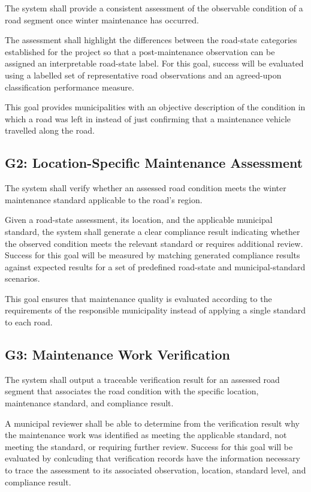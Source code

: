 \documentclass{article}
\begin{document}
The system shall provide a consistent assessment of the observable condition of
a road segment once winter maintenance has occurred.

The assessment shall highlight the differences between the road-state categories established
for the project so that a post-maintenance observation can be assigned an
interpretable road-state label. For this goal, success will be evaluated using a
labelled set of representative road observations and an agreed-upon
classification performance measure.

This goal provides municipalities with an objective description of the
condition in which a road was left in instead of just confirming that a
maintenance vehicle travelled along the road.

\subsection{G2: Location-Specific Maintenance Assessment}

The system shall verify whether an assessed road condition meets the
winter maintenance standard applicable to the road's region.

Given a road-state assessment, its location, and the applicable municipal
standard, the system shall generate a clear compliance result indicating whether
the observed condition meets the relevant standard or requires additional
review.
Success for this goal will be measured by matching generated compliance
results against expected results for a set of predefined road-state and
municipal-standard scenarios.

This goal ensures that maintenance quality is evaluated according to the
requirements of the responsible municipality instead of applying a single
standard to each road.

\subsection{G3: Maintenance Work Verification}

The system shall output a traceable verification result for an assessed road
segment that associates the road condition with the specific location,
maintenance standard, and compliance result.

A municipal reviewer shall be able to determine from the verification result
why the maintenance work was identified as meeting the applicable standard,
not meeting the standard, or requiring further review. Success for this goal
will be evaluated by conlcuding that verification records have the
information necessary to trace the assessment to its associated observation,
location, standard level, and compliance result.
\end{document}
